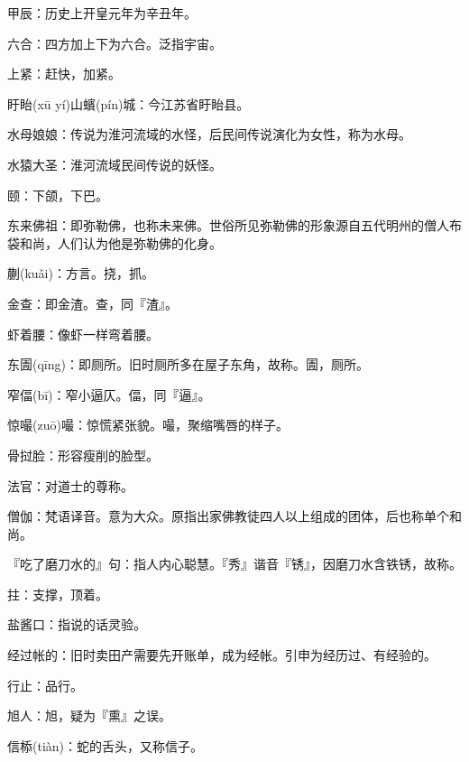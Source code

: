 \startbuffer[1884]
甲辰：历史上开皇元年为辛丑年。
\stopbuffer


\startbuffer[1885]
六合：四方加上下为六合。泛指宇宙。
\stopbuffer


\startbuffer[1886]
上紧：赶快，加紧。
\stopbuffer


\startbuffer[1887]
盱眙(xū yí)山蠙(pín)城：今江苏省盱眙县。
\stopbuffer

\startbuffer[1888]
水母娘娘：传说为淮河流域的水怪，后民间传说演化为女性，称为水母。
\stopbuffer


\startbuffer[1889]
水猿大圣：淮河流域民间传说的妖怪。
\stopbuffer


\startbuffer[1890]
颐：下颌，下巴。
\stopbuffer


\startbuffer[1891]
东来佛祖：即弥勒佛，也称未来佛。世俗所见弥勒佛的形象源自五代明州的僧人布袋和尚，人们认为他是弥勒佛的化身。
\stopbuffer


\startbuffer[1892]
蒯(kuǎi)：方言。挠，抓。
\stopbuffer


\startbuffer[1893]
金查：即金渣。查，同『渣』。
\stopbuffer


\startbuffer[1894]
虾着腰：像虾一样弯着腰。
\stopbuffer


\startbuffer[1895]
东圊(qīng)：即厕所。旧时厕所多在屋子东角，故称。圊，厕所。
\stopbuffer


\startbuffer[1896]
窄偪(bī)：窄小逼仄。偪，同『逼』。
\stopbuffer


\startbuffer[1897]
惊嘬(zuō)嘬：惊慌紧张貌。嘬，聚缩嘴唇的样子。
\stopbuffer


\startbuffer[1898]
骨挝脸：形容瘦削的脸型。
\stopbuffer


\startbuffer[1899]
法官：对道士的尊称。
\stopbuffer


\startbuffer[1900]
僧伽：梵语译音。意为大众。原指出家佛教徒四人以上组成的团体，后也称单个和尚。
\stopbuffer


\startbuffer[1901]
『吃了磨刀水的』句：指人内心聪慧。『秀』谐音『锈』，因磨刀水含铁锈，故称。
\stopbuffer


\startbuffer[1902]
拄：支撑，顶着。
\stopbuffer


\startbuffer[1903]
盐酱口：指说的话灵验。
\stopbuffer


\startbuffer[1904]
经过帐的：旧时卖田产需要先开账单，成为经帐。引申为经历过、有经验的。
\stopbuffer


\startbuffer[1905]
行止：品行。
\stopbuffer


\startbuffer[1906]
旭人：旭，疑为『熏』之误。
\stopbuffer


\startbuffer[1907]
信㮇(tiàn)：蛇的舌头，又称信子。
\stopbuffer


